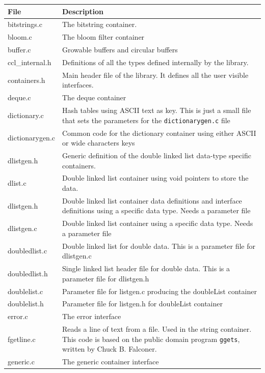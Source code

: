 \documentclass[12pt,a4paper,openany]{memoir} %
\begin{document}
{{{\small
\begin{longtable}{||p{3.5cm}|p{11cm}||}
\hline
\textbf{File}&\textbf{Description}\\\hline \hline 
bitstrings.c&The bitstring container.\\\hline
bloom.c&The bloom filter container\\\hline
buffer.c&Growable buffers and circular buffers\\\hline
ccl\_internal.h&Definitions of all the types defined internally by the library.\\\hline
containers.h&Main header file of the library. It defines all the user visible interfaces.\\\hline
deque.c&The deque container\\\hline
dictionary.c&Hash tables using ASCII text as key. This is just a small file that sets the parameters for the \verb,dictionarygen.c, file\\\hline
dictionarygen.c&Common code for the dictionary container using either ASCII or wide characters keys\\\hline
dlistgen.h&Generic definition of the double linked list data-type specific containers.\\\hline
dlist.c&Double linked list container using void pointers to store the data.\\\hline
dlistgen.h&Double linked list container data definitions and interface definitions using a specific data type. Needs a parameter file\\\hline
dlistgen.c&Double linked list container using a specific data type. Needs a parameter file\\\hline
doubledlist.c&Double linked list for double data. This is a parameter file for dlistgen.c\\\hline
doubledlist.h&Single linked list header file for double data. This is a parameter file for dlistgen.h\\\hline
doublelist.c& Parameter file for listgen.c producing the doubleList container\\\hline
doublelist.h&Parameter file for listgen.h for doubleList container\\\hline
error.c&The error interface\\\hline
fgetline.c&Reads a line of text from a file. Used in the string container. This code is based on the public 
domain program \verb,ggets,, written by Chuck B. Falconer.\\\hline
generic.c&The generic container interface\\\hline

\end{longtable}}}}
\end{document}
